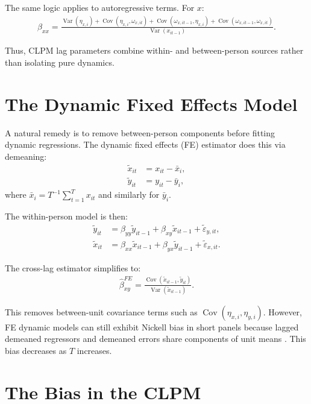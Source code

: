 \documentclass[12pt]{article}
\begin{document}
The same logic applies to autoregressive terms. For $x$:
\begin{align}
\hat{\beta}_{xx} = \frac{\operatorname{Var}(\eta_{x,i}) + \operatorname{Cov}(\eta_{x,i}, \omega_{x,it}) + \operatorname{Cov}(\omega_{x,it-1}, \eta_{x,i}) + \operatorname{Cov}(\omega_{x,it-1}, \omega_{x,it})}{\operatorname{Var}(x_{it-1})}.
\end{align}

Thus, CLPM lag parameters combine within- and between-person sources rather than isolating pure dynamics.

\section{The Dynamic Fixed Effects Model}

A natural remedy is to remove between-person components before fitting dynamic regressions. The dynamic fixed effects (FE) estimator does this via demeaning:
\begin{align}
\tilde{x}_{it} &= x_{it} - \bar{x}_i,\\
\tilde{y}_{it} &= y_{it} - \bar{y}_i,
\end{align}
where $\bar{x}_i = T^{-1}\sum_{t=1}^{T}x_{it}$ and similarly for $\bar{y}_i$.

The within-person model is then:
\begin{align}
\tilde{y}_{it} &= \beta_{yy}\tilde{y}_{it-1} + \beta_{xy}\tilde{x}_{it-1} + \tilde{\varepsilon}_{y,it},\\
\tilde{x}_{it} &= \beta_{xx}\tilde{x}_{it-1} + \beta_{yx}\tilde{y}_{it-1} + \tilde{\varepsilon}_{x,it}.
\end{align}

The cross-lag estimator simplifies to:
\begin{align}
\hat{\beta}_{xy}^{FE} = \frac{\operatorname{Cov}(\tilde{x}_{it-1}, \tilde{y}_{it})}{\operatorname{Var}(\tilde{x}_{it-1})}.
\end{align}

This removes between-unit covariance terms such as $\operatorname{Cov}(\eta_{x,i},\eta_{y,i})$. However, FE dynamic models can still exhibit Nickell bias in short panels because lagged demeaned regressors and demeaned errors share components of unit means \cite{nickell_biases_1981}. This bias decreases as $T$ increases.

\section{The Bias in the CLPM}
\end{document}
